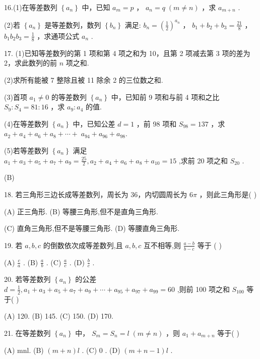 \documentclass[10pt]{article}
\begin{document}
16.(1)在等差数列 \(\left\{  {a}_{n}\right\}\) 中，已知 \({a}_{m} = p\) ， \({a}_{n} = q\;\left( {m \neq  n}\right)\) ，求 \({a}_{m + n}\) .

(2)若 \(\left\{  {a}_{n}\right\}\) 是等差数列，数列 \(\left\{  {b}_{n}\right\}\) 满足: \({b}_{n} = {\left( \frac{1}{2}\right) }^{{a}_{n}}\) ， \({b}_{1} + {b}_{2} + {b}_{3} = \frac{21}{8}\) ， \({b}_{1}{b}_{2}{b}_{3} = \frac{1}{8}\) ，求通项公式 \({a}_{n}\) .

17. (1)已知等差数列的第 1 项和第 4 项之和为 10，且第 2 项减去第 3 项的差为 2，求此数列的前 \(n\) 项之和.

(2)求所有能被 7 整除且被 11 除余 2 的三位数之和.

(3)首项 \({a}_{1} \neq  0\) 的等差数列 \(\left\{  {a}_{n}\right\}\) 中，已知前 9 项和与前 4 项和之比 \({S}_{9} : {S}_{4} = {81} : {16}\) ，求 \({a}_{9} : {a}_{4}\) 的值.

(4)在等差数列 \(\left\{  {a}_{n}\right\}\) 中，已知公差 \(d = 1\) ，前 98 项和 \({S}_{98} = {137}\) ，求 \({a}_{2} + {a}_{4} + {a}_{6} + {a}_{8} + \cdots  + \; {a}_{94} + {a}_{96} + {a}_{98}.\)

(5)若等差数列 \(\left\{  {a}_{n}\right\}\) 满足 \({a}_{1} + {a}_{3} + {a}_{5} + {a}_{7} + {a}_{9} = \frac{25}{2},{a}_{2} + {a}_{4} + {a}_{6} + {a}_{8} + {a}_{10} = {15}\) ,求前 20 项之和 \({S}_{20}\) .

(B)

18. 若三角形三边长成等差数列，周长为 36，内切圆周长为 \({6\pi }\) ，则此三角形是( )

(A) 正三角形. (B) 等腰三角形,但不是直角三角形.

(C) 直角三角形,但不是等腰三角形. (D) 等腰直角三角形.

19. 若 \(a,b,c\) 的倒数依次成等差数列,且 \(a,b,c\) 互不相等,则 \(\frac{a - b}{b - c}\) 等于 ( )

(A) \(\frac{c}{a}\) . (B) \(\frac{a}{b}\) . (C) \(\frac{a}{c}\) . (D) \(\frac{b}{c}\) .

20. 若等差数列 \(\left\{  {a}_{n}\right\}\) 的公差 \(d = \frac{1}{2},{a}_{1} + {a}_{3} + {a}_{5} + {a}_{7} + {a}_{9} + \cdots  + {a}_{95} + {a}_{97} + {a}_{99} = {60}\) ,则前 100 项之和 \({S}_{100}\) 等于( )

(A) 120. (B) 145. (C) 150. (D) 170.

21. 在等差数列 \(\left\{  {a}_{n}\right\}\) 中， \({S}_{m} = {S}_{n} = l\;\left( {m \neq  n}\right)\) ，则 \({a}_{1} + {a}_{m + n}\) 等于( )

(A) mnl. (B) \(\left( {m + n}\right) l\) . (C) 0 . (D) \(\left( {m + n - 1}\right) l\) .
\end{document}
